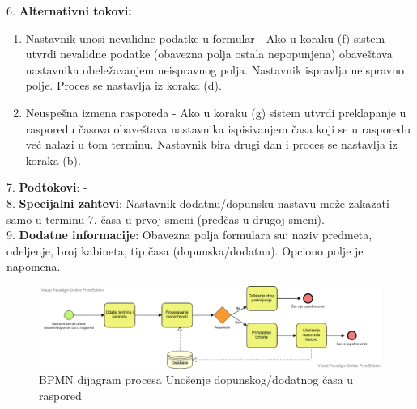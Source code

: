 \documentclass{article}
\begin{document}
6. \textbf{Alternativni tokovi:}
\begin{enumerate} [label=(\roman*)]
\item Nastavnik unosi nevalidne podatke u formular - Ako u koraku (f) sistem utvrdi nevalidne podatke (obavezna polja ostala nepopunjena) obaveštava nastavnika obeležavanjem neispravnog polja. Nastavnik ispravlja neispravno polje. Proces se nastavlja iz koraka (d).
\item Neuspešna izmena rasporeda - Ako u koraku (g) sistem utvrdi preklapanje u rasporedu časova obaveštava nastavnika ispisivanjem časa koji se u rasporedu već nalazi u tom terminu. Nastavnik bira drugi dan i proces se nastavlja iz koraka (b).

\end{enumerate}

7. \textbf{Podtokovi}: - \\

8. \textbf{Specijalni zahtevi}: Nastavnik dodatnu/dopunsku nastavu može zakazati samo u terminu 7. časa u prvoj smeni (predčas u drugoj smeni). \\

9. \textbf{Dodatne informacije}: Obavezna polja formulara su: naziv predmeta, odeljenje, broj kabineta, tip časa (dopunska/dodatna). Opciono polje je napomena. \\

\begin{figure} [!ht]
    \begin{center}
        \includegraphics[scale=0.4]{imgs/BPMN_zakazivanje_dopunske_dodatne.png}
    \end{center}
\caption{BPMN dijagram procesa Unošenje dopunskog/dodatnog časa u raspored}
\end{figure}
\end{document}
